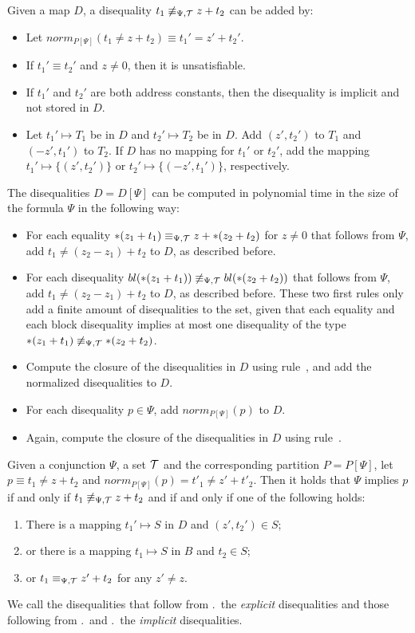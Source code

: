 Given a map $D$, a disequality $t_1 \not\equiv_{\Psi,\mathcal{T}} z + t_2$ can be added by:
\begin{itemize}
\item Let $norm_{P[\Psi]}(t_1 \neq z + t_2) \equiv t_1' = z' + t_2'$.
\item If $t_1' \equiv t_2'$ and $z \neq 0$, then it is unsatisfiable.
\item If $t_1'$ and $t_2'$ are both address constants, then the disequality is implicit and not stored in $D$.
\item Let $t_1' \mapsto T_1$ be in $D$ and $t_2' \mapsto T_2$ be in $D$. Add $(z', t_2')$ to $T_1$ and $(-z', t_1')$ to $T_2$.
If $D$ has no mapping for $t_1'$ or $t_2'$, add the mapping $t_1' \mapsto \{(z', t_2')\}$ or $t_2' \mapsto \{(-z', t_1')\}$, respectively.
\end{itemize}

The disequalities $D = D[\Psi]$ can be computed in polynomial time in the size of the formula $\Psi$ in the following way:

\begin{itemize}
    \item For each equality $*(z_1 + t_1) \equiv_{\Psi,\mathcal{T}} z + *(z_2 + t_2)$ for $z \neq 0$
          that follows from $\Psi$,
          add $t_1 \neq (z_2 - z_1) + t_2$ to $D$, as described before.
    \item For each disequality $bl(*(z_1 + t_1)) \not\equiv_{\Psi,\mathcal{T}} bl(*(z_2 + t_2))$ that follows from $\Psi$, add $t_1 \neq (z_2 - z_1) + t_2$ to $D$, as described before.
          These two first rules only add a finite amount of disequalities to the set, given that each equality and each block disequality implies at most one disequality of the type $*(z_1 + t_1) \not\equiv_{\Psi,\mathcal{T}} *(z_2 + t_2)$.
    \item Compute the closure of the disequalities in $D$ using rule~, and add the normalized disequalities to $D$.
    \item For each disequality $p \in \Psi$, add $norm_{P[\Psi]}(p)$ to $D$.
    \item Again, compute the closure of the disequalities in $D$ using rule~.
\end{itemize}

Given a conjunction $\Psi$, a set $\mathcal{T}$ and the corresponding partition $P = P[\Psi]$, let $p \equiv t_1 \neq z + t_2$ and $norm_{P[\Psi]}(p) = t'_1 \neq z' + t'_2$.
Then
it holds that $\Psi$ implies $p$ if and only if $t_1 \not\equiv_{\Psi,\mathcal{T}} z + t_2$ and if and only if one of the following holds:

\begin{enumerate}
    \item\label{item:diseqs} There is a mapping $t_1' \mapsto S$ in $D$ and $(z', t_2') \in S$;
    \item\label{item:bl-diseqs} or there is a mapping $t_1 \mapsto S$ in $B$ and $t_2 \in S$;
    \item\label{item:eqs} or $t_1 \equiv_{\Psi,\mathcal{T}} z' + t_2$ for any $z' \neq z$.
\end{enumerate}
We call the disequalities that follow from .\ the \emph{explicit} disequalities and those following from .\ and .\ the \emph{implicit} disequalities.
